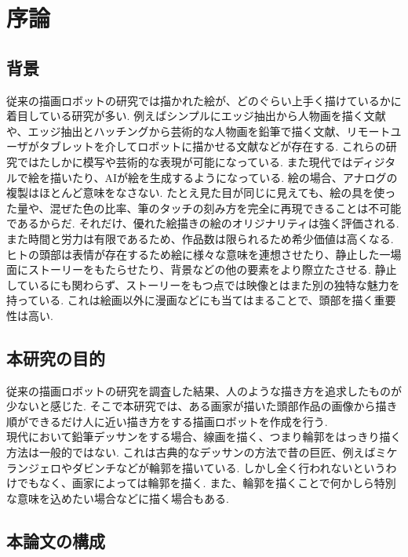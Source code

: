 \chapter{序論}
  \label{chap:intro}
  \section{背景}
    \label{sec:background}
	従来の描画ロボットの研究では描かれた絵が、どのぐらい上手く描けているかに着目している研究が多い. 例えばシンプルにエッジ抽出から人物画を描く文献\cite{1}や、エッジ抽出とハッチングから芸術的な人物画を鉛筆で描く文献\cite{2}、リモートユーザがタブレットを介してロボットに描かせる文献\cite{3}などが存在する. これらの研究ではたしかに模写や芸術的な表現が可能になっている.
	\hspace{10pt}また現代ではディジタルで絵を描いたり、AIが絵を生成するようになっている.
	絵の場合、アナログの複製はほとんど意味をなさない. 
	たとえ見た目が同じに見えても、絵の具を使った量や、混ぜた色の比率、筆のタッチの刻み方を完全に再現できることは不可能であるからだ.
	それだけ、優れた絵描きの絵のオリジナリティは強く評価される.
	また時間と労力は有限であるため、作品数は限られるため希少価値は高くなる.
	\hspace{10pt}
	ヒトの頭部は表情が存在するため絵に様々な意味を連想させたり、静止した一場面にストーリーをもたらせたり、背景などの他の要素をより際立たさせる.
	静止しているにも関わらず、ストーリーをもつ点では映像とはまた別の独特な魅力を持っている.
	これは絵画以外に漫画などにも当てはまることで、頭部を描く重要性は高い.
  \section{本研究の目的}
    \label{sec:target}
	従来の描画ロボットの研究を調査した結果、人のような描き方を追求したものが少ないと感じた.
	そこで本研究では、ある画家が描いた頭部作品の画像から描き順ができるだけ人に近い描き方をする描画ロボットを作成を行う.\\
	\hspace{10pt}
   現代において鉛筆デッサンをする場合、線画を描く、つまり輪郭をはっきり描く方法は一般的ではない.
	これは古典的なデッサンの方法で昔の巨匠、例えばミケランジェロやダビンチなどが輪郭を描いている.
	しかし全く行われないというわけでもなく、画家によっては輪郭を描く.
	また、輪郭を描くことで何かしら特別な意味を込めたい場合などに描く場合もある.
	\section{本論文の構成}
    \label{sec:construction_of_this_paper}
    
